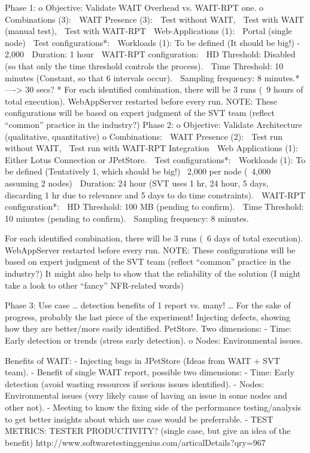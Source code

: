 \documentclass[runningheads,a4paper]{llncs}
\begin{document}
Phase 1:
o	Objective: Validate WAIT Overhead vs. WAIT-RPT one.
o	Combinations (3):
	WAIT Presence (3): 
	Test without WAIT, 
	Test with WAIT (manual test), 
	Test with WAIT-RPT
	Web-Applications (1): 
	Portal (single node)
	Test configurations*:
	Workloads (1): To be defined (It should be big!) - 2,000
	Duration: 1 hour
	WAIT-RPT configuration:
	HD Threshold: Disabled (so that only the time threshold controls the process).
	Time Threshold: 10 minutes (Constant, so that 6 intervals occur).
	Sampling frequency: 8 minutes.* ----> 30 secs?
* For each identified combination, there will be 3 runs (~9 hours of total execution). WebAppServer restarted before every run.
NOTE: These configurations will be based on expert judgment of the SVT team (reflect “common” practice in the industry?)
Phase 2: 
o	Objective: Validate Architecture (qualitative, quantitative)
o	Combinations:
	WAIT Presence (2):
	Test run without WAIT,
	Test run with WAIT-RPT Integration
	Web Applications (1):
	Either Lotus Connection or JPetStore.
	Test configurations*:
	Workloads (1): To be defined (Tentatively 1, which should be big!) ~2,000 per node (~4,000 assuming 2 nodes)
	Duration: 24 hour (SVT uses 1 hr, 24 hour, 5 days, discarding 1 hr due to relevance and 5 days to do time constraints).
	WAIT-RPT configuration*:
	HD Threshold: 100 MB (pending to confirm).
	Time Threshold: 10 minutes (pending to confirm).
	Sampling frequency: 8 minutes.

For each identified combination, there will be 3 runs (~6 days of total execution). WebAppServer restarted before every run.
NOTE: These configurations will be based on expert judgment of the SVT team (reflect “common” practice in the industry?)
It might also help to show that the reliability of the solution (I might take a look to other “fancy” NFR-related words)

Phase 3: 
Use case … detection benefits of 1 report vs. many! … For the sake of progress, probably the last piece of the experiment!
Injecting defects, showing how they are better/more easily identified. PetStore.
Two dimensions:
- Time: Early detection or trends (stress early detection).
o	Nodes: Environmental issues.

Benefits of WAIT:
- Injecting bugs in JPetStore (Ideas from WAIT + SVT team).
- Benefit of single WAIT report, possible two dimensions:
- Time: Early detection (avoid wasting resources if serious issues identified).
- Nodes: Environmental issues (very likely cause of having an issue in some nodes and other not).
- Meeting to know the fixing side of the performance testing/analysis to get better insights about which use case would be preferrable.
- TEST METRICS: TESTER PRODUCTIVITY? (single case, but give an idea of the benefit)
http://www.softwaretestinggenius.com/articalDetails?qry=967
\end{document}
